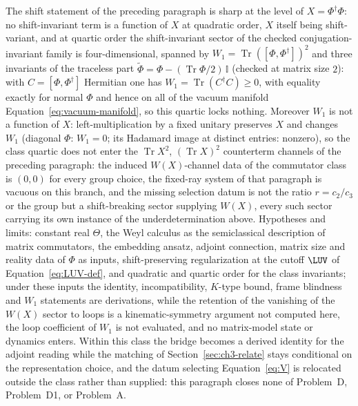 The shift statement of the preceding paragraph is sharp at the level of \(X=\Phi^\dagger\Phi\): no shift-invariant term is a function of \(X\) at quadratic order, \(X\) itself being shift-variant, and at quartic order the shift-invariant sector of the checked conjugation-invariant family is four-dimensional, spanned by \(W_1=\operatorname{Tr}([\Phi,\Phi^\dagger])^2\) and three invariants of the traceless part \(\widetilde\Phi=\Phi-(\operatorname{Tr}\Phi/2)\,\mathbb I\) (checked at matrix size \(2\)): with \(C=[\Phi,\Phi^\dagger]\) Hermitian one has \(W_1=\operatorname{Tr}(C^\dagger C)\ge0\), with equality exactly for normal \(\Phi\) and hence on all of the vacuum manifold Equation~\eqref{eq:vacuum-manifold}, so this quartic locks nothing.
Moreover \(W_1\) is not a function of \(X\): left-multiplication by a fixed unitary preserves \(X\) and changes \(W_1\) (diagonal \(\Phi\): \(W_1=0\); its Hadamard image at distinct entries: nonzero), so the class quartic does not enter the \(\operatorname{Tr}X^2\), \((\operatorname{Tr}X)^2\) counterterm channels of the preceding paragraph: the induced \(W(X)\)-channel data of the commutator class is \((0,0)\) for every group choice, the fixed-ray system of that paragraph is vacuous on this branch, and the missing selection datum is not the ratio \(r=c_2/c_3\) or the group but a shift-breaking sector supplying \(W(X)\), every such sector carrying its own instance of the underdetermination above.
Hypotheses and limits: constant real \(\Theta\), the Weyl calculus as the semiclassical description of matrix commutators, the embedding ansatz, adjoint connection, matrix size and reality data of \(\Phi\) as inputs, shift-preserving regularization at the cutoff \(\LUV\) of Equation~\eqref{eq:LUV-def}, and quadratic and quartic order for the class invariants; under these inputs the identity, incompatibility, \(K\)-type bound, frame blindness and \(W_1\) statements are derivations, while the retention of the vanishing of the \(W(X)\) sector to loops is a kinematic-symmetry argument not computed here, the loop coefficient of \(W_1\) is not evaluated, and no matrix-model state or dynamics enters.
Within this class the bridge becomes a derived identity for the adjoint reading while the matching of Section~\ref{sec:ch3-relate} stays conditional on the representation choice, and the datum selecting Equation~\eqref{eq:V} is relocated outside the class rather than supplied: this paragraph closes none of Problem~D, Problem~D1, or Problem~A.
